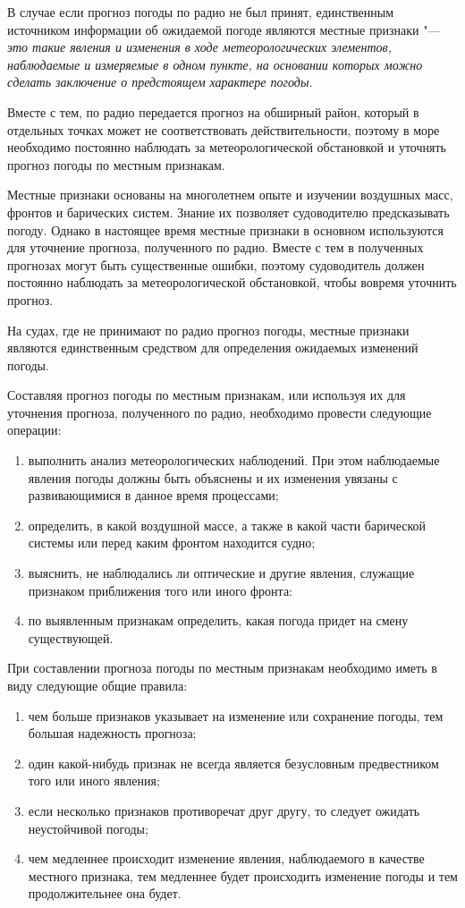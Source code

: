 \documentclass[a4paper, 12pt, twoside, final, book, russian, fittopage, cyremdash, openright]{ncc}
\begin{document}
В случае если прогноз погоды по радио не был принят, единственным
источником информации об ожидаемой погоде являются местные признаки "---
\textit{это такие явления и изменения в ходе метеорологических элементов,
наблюдаемые и измеряемые в одном пункте, на основании которых можно
сделать заключение о предстоящем характере погоды.}

Вместе с тем, по радио передается прогноз на обширный район, который в
отдельных точках может не соответствовать действительности, поэтому в
море необходимо постоянно наблюдать за метеорологической обстановкой и
уточнять прогноз погоды по местным признакам.

Местные признаки основаны на многолетнем опыте и изучении воздушных
масс, фронтов и барических систем. Знание их позволяет судоводителю
предсказывать погоду. Однако в настоящее время местные признаки в
основном используются для уточнение прогноза, полученного по
радио. Вместе с тем в полученных прогнозах могут быть существенные
ошибки, поэтому судоводитель должен постоянно наблюдать за
метеорологической обстановкой, чтобы вовремя уточнить прогноз.

На судах, где не принимают по радио прогноз погоды, местные признаки
являются единственным средством для определения ожидаемых изменений
погоды.

Составляя прогноз погоды по местным признакам, или используя их для уточнения прогноза, полученного по радио, необходимо провести следующие операции:

\begin{enumerate}[label={\arabic*.~}]
\item выполнить анализ метеорологических наблюдений. При этом
  наблюдаемые явления погоды должны быть объяснены и их изменения
  увязаны с развивающимися в данное время процессами;
\item определить, в какой воздушной массе, а также в какой части
  барической системы или перед каким фронтом находится судно;
\item выяснить, не наблюдались ли оптические и другие явления,
  служащие признаком приближения того или иного фронта:
\item по выявленным признакам определить, какая погода придет на смену
  существующей.
\end{enumerate}

При составлении прогноза погоды по местным признакам необходимо иметь в виду следующие общие правила:

\begin{enumerate}[label={\textbullet~}]
\item чем больше признаков указывает на изменение или сохранение
  погоды, тем большая надежность прогноза;
\item один какой-нибудь признак не всегда является безусловным
  предвестником того или иного явления;
\item если несколько признаков противоречат друг другу, то следует
  ожидать неустойчивой погоды;
\item чем медленнее происходит изменение явления, наблюдаемого в
  качестве местного признака, тем медленнее будет происходить
  изменение погоды и тем продолжительнее она будет.
\end{enumerate}
\end{document}

